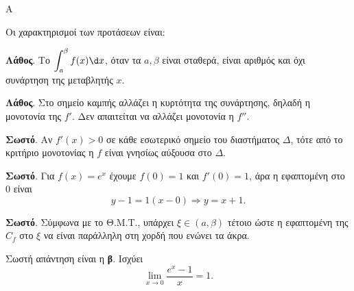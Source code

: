 \begin{thema}{Α}
\begin{erwthma}
\item {}

\item {}

\item {}

\item Οι χαρακτηρισμοί των προτάσεων είναι:
\begin{alist}
\item \textbf{Λάθος}. Το $\dint_a^\beta f(x)\d x$, όταν τα $a,\beta$ είναι σταθερά, είναι αριθμός και όχι συνάρτηση της μεταβλητής $x$.
\item \textbf{Λάθος}. Στο σημείο καμπής αλλάζει η κυρτότητα της συνάρτησης, δηλαδή η μονοτονία της $f'$. Δεν απαιτείται να αλλάζει μονοτονία η $f''$.
\item \textbf{Σωστό}. Αν $f'(x)>0$ σε κάθε εσωτερικό σημείο του διαστήματος $\Delta$, τότε από το κριτήριο μονοτονίας η $f$ είναι γνησίως αύξουσα στο $\Delta$.
\item \textbf{Σωστό}. Για $f(x)=e^x$ έχουμε $f(0)=1$ και $f'(0)=1$, άρα η εφαπτομένη στο $0$ είναι
\[ y-1=1(x-0)\Rightarrow y=x+1. \]
\item \textbf{Σωστό}. Σύμφωνα με το Θ.Μ.Τ., υπάρχει $\xi\in(a,\beta)$ τέτοιο ώστε η εφαπτομένη της $C_f$ στο $\xi$ να είναι παράλληλη στη χορδή που ενώνει τα άκρα.
\end{alist}

\item Σωστή απάντηση είναι η \textbf{β}. Ισχύει
\[ \lim_{x\to0}\dfrac{e^x-1}{x}=1. \]
\end{erwthma}
\end{thema}

